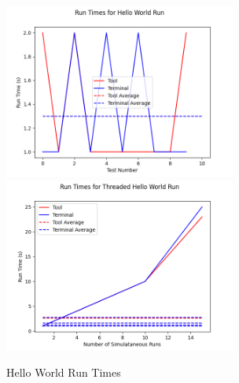 \begin{figure}[h!]
  \includegraphics[width=3in]{images/evaluation/run7/hello-world}
  \includegraphics[width=3in]{images/evaluation/run7/thread-hello-world}
  \caption{Hello World Run Times}
  \label{img:helloWorld}
\end{figure}

